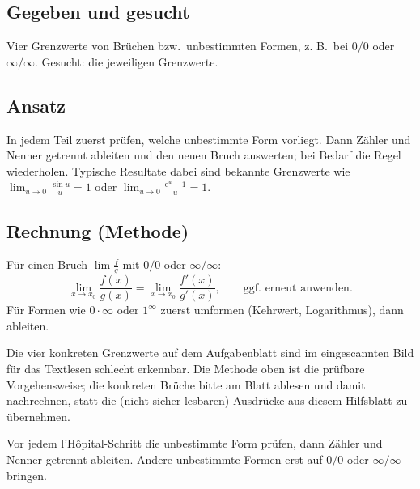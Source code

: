 
\subsection*{Gegeben und gesucht}
Vier Grenzwerte von Brüchen bzw.\ unbestimmten Formen, z. B.\ bei $0/0$ oder
$\infty/\infty$. Gesucht: die jeweiligen Grenzwerte.

\subsection*{Ansatz}
In jedem Teil zuerst prüfen, welche unbestimmte Form vorliegt. Dann Zähler
und Nenner getrennt ableiten und den neuen Bruch auswerten; bei Bedarf die
Regel wiederholen. Typische Resultate dabei sind bekannte Grenzwerte wie
$\lim_{u\to0}\frac{\sin u}{u}=1$ oder $\lim_{u\to0}\frac{\mathrm e^u-1}{u}=1$.

\subsection*{Rechnung (Methode)}
Für einen Bruch $\lim\frac{f}{g}$ mit $0/0$ oder $\infty/\infty$:
\begin{equation}
  \lim_{x\to x_0}\frac{f(x)}{g(x)}
  =\lim_{x\to x_0}\frac{f'(x)}{g'(x)},
  \qquad
  \text{ggf.\ erneut anwenden.}
\end{equation}
Für Formen wie $0\cdot\infty$ oder $1^\infty$ zuerst umformen
(Kehrwert, Logarithmus), dann ableiten.

\begin{achtung}
Die vier konkreten Grenzwerte auf dem Aufgabenblatt sind im eingescannten
Bild für das Textlesen schlecht erkennbar. Die Methode oben ist die prüfbare
Vorgehensweise; die konkreten Brüche bitte am Blatt ablesen und damit
nachrechnen, statt die (nicht sicher lesbaren) Ausdrücke aus diesem Hilfsblatt
zu übernehmen.
\end{achtung}

\begin{merksatz}
Vor jedem l'Hôpital-Schritt die unbestimmte Form prüfen, dann Zähler und
Nenner getrennt ableiten. Andere unbestimmte Formen erst auf $0/0$ oder
$\infty/\infty$ bringen.
\end{merksatz}

